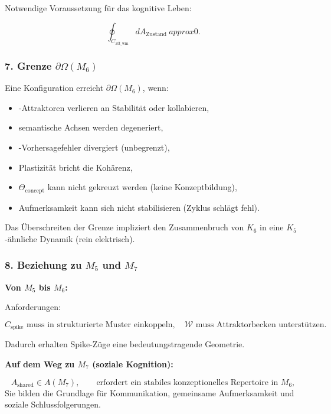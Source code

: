 Notwendige Voraussetzung für das kognitive Leben:

\[
\oint_{C_{\mathrm{att\_wm}}} dA_{\mathrm{Zustand}} \ approx 0.
\]

\subsubsection*{7. Grenze \texorpdfstring{$\partial\Omega(M_6)$}{\partial\Omega(M_6)}}

Eine Konfiguration erreicht $\partial\Omega(M_6)$, wenn:

\begin{itemize}
    \item-Attraktoren verlieren an Stabilität oder kollabieren,
    \item semantische Achsen werden degeneriert,
    \item-Vorhersagefehler divergiert (unbegrenzt),
    \item Plastizität bricht die Kohärenz,
    \item $\Theta_{\mathrm{concept}}$ kann nicht gekreuzt werden (keine Konzeptbildung),
    \item Aufmerksamkeit kann sich nicht stabilisieren (Zyklus schlägt fehl).
\end{itemize}

Das Überschreiten der Grenze impliziert den Zusammenbruch von $K_6$ in eine $K_5$-ähnliche Dynamik (rein elektrisch).

\subsubsection*{8. Beziehung zu \texorpdfstring{$M_5$}{M_5} und \texorpdfstring{$M_7$}{M_7}}

\textbf{Von $M_5$ bis $M_6$:}

Anforderungen:

\[
C_{\mathrm{spike}} \text{ muss in strukturierte Muster einkoppeln},
\quad
\mathcal{W} \text{ muss Attraktorbecken unterstützen}.
\]

Dadurch erhalten Spike-Züge eine bedeutungstragende Geometrie.

\textbf{Auf dem Weg zu $M_7$ (soziale Kognition):}

\[
A_{\mathrm{shared}} \in A(M_7),
\qquad
\text{erfordert ein stabiles konzeptionelles Repertoire in } M_6,
\]
Sie bilden die Grundlage für Kommunikation, gemeinsame Aufmerksamkeit und soziale Schlussfolgerungen.

